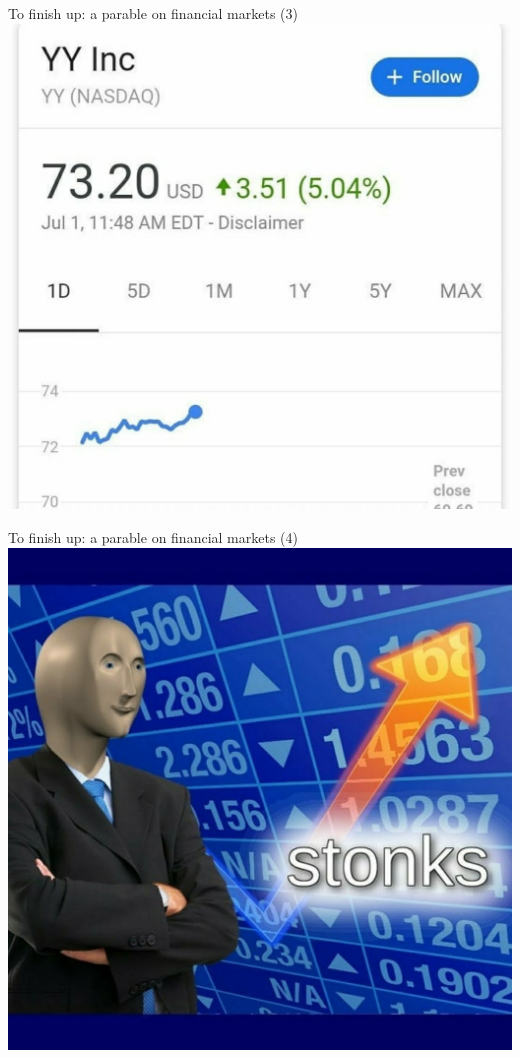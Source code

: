\documentclass[english,10pt
,aspectratio=169
]{beamer}
\begin{document}
\begin{frame}{To finish up: a parable on financial markets (3)}
	\centering \includegraphics[width=0.6\paperwidth]{pics/yy3}
\end{frame}


\begin{frame}{To finish up: a parable on financial markets (4)}
	\centering \includegraphics[width=0.6\paperwidth]{pics/yy4}
\end{frame}
\end{document}
